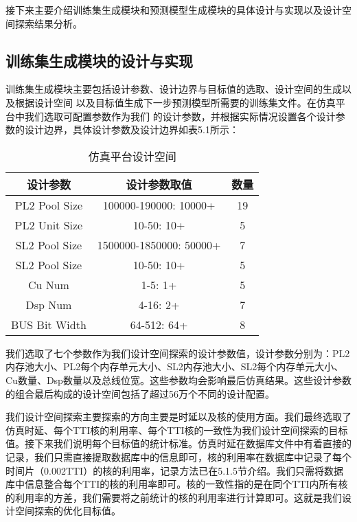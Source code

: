 接下来主要介绍训练集生成模块和预测模型生成模块的具体设计与实现以及设计空间探索结果分析。

\subsection{训练集生成模块的设计与实现}

训练集生成模块主要包括设计参数、设计边界与目标值的选取、设计空间的生成以及根据设计空间
以及目标值生成下一步预测模型所需要的训练集文件。在仿真平台中我们选取可配置参数作为我们
的设计参数，并根据实际情况设置各个设计参数的设计边界，具体设计参数及设计边界如表5.1所示：

\begin{table}[!h]
    \centering\normalsize
    \caption{仿真平台设计空间}
    \begin{tabular}{c|c|c}
    \hline
    \textbf{设计参数} & \textbf{设计参数取值}         & \textbf{数量} \\ \hline
    PL2 Pool Size & 100000-190000: 10000+   & 19          \\ \hline
    PL2 Unit Size & 10-50: 10+              & 5           \\ \hline
    SL2 Pool Size & 1500000-1850000: 50000+ & 7           \\ \hline
    SL2 Pool Size & 10-50: 10+              & 5           \\ \hline
    Cu Num        & 1-5: 1+                 & 5           \\ \hline
    Dsp Num       & 4-16: 2+                & 7           \\ \hline
    BUS Bit Width & 64-512: 64+             & 8           \\ \hline
    \end{tabular}
    \end{table}

我们选取了七个参数作为我们设计空间探索的设计参数值，设计参数分别为：PL2内存池大小、PL2每个内存单元大小、SL2内存池大小、SL2每个内存单元大小、Cu数量、Dsp数量以及总线位宽。这些参数均会影响最后仿真结果。这些设计参数的组合最后构成的设计空间包括了超过56万个不同的设计配置。

我们设计空间探索主要探索的方向主要是时延以及核的使用方面。我们最终选取了仿真时延、每个TTI核的利用率、每个TTI核的一致性为我们设计空间探索的目标值。接下来我们说明每个目标值的统计标准。仿真时延在数据库文件中有着直接的记录，我们只需直接提取数据库中的信息即可，核的利用率在数据库中记录了每个时间片（0.002TTI）的核的利用率，记录方法已在5.1.5节介绍。我们只需将数据库中信息整合每个TTI的核的利用率即可。核的一致性指的是在同个TTI内所有核的利用率的方差，我们需要将之前统计的核的利用率进行计算即可。这就是我们设计空间探索的优化目标值。

